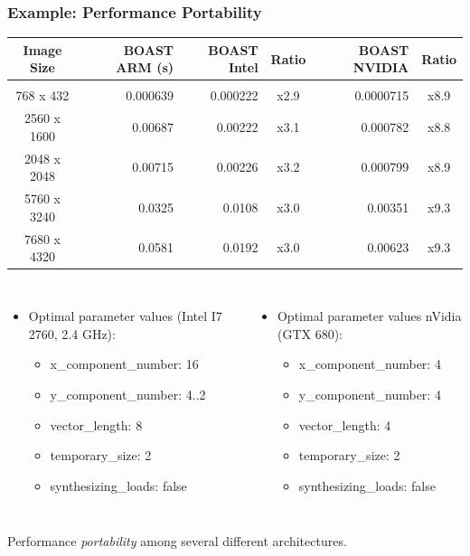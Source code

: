\documentclass{beamer}
\begin{document}
\begin{frame}
  \frametitle{Example: Performance Portability}
  \begin{center}
  \scriptsize
  \begin{tabular}{c|r|r|c|r|c}
    Image Size & BOAST ARM (s) & BOAST Intel & Ratio & BOAST NVIDIA & Ratio \\
    \hline&&&&\\
  768 x 432   & 0.000639     & 0.000222    & x2.9  & 0.0000715    & x8.9  \\
  2560 x 1600 & 0.00687      & 0.00222     & x3.1  & 0.000782     & x8.8  \\
  2048 x 2048 & 0.00715      & 0.00226     & x3.2  & 0.000799     & x8.9  \\
  5760 x 3240 & 0.0325       & 0.0108      & x3.0  & 0.00351      & x9.3  \\
  7680 x 4320 & 0.0581       & 0.0192      & x3.0  & 0.00623      & x9.3
  \end{tabular}
  \end{center}

  \begin{columns}
  \begin{itemize}
    \item \footnotesize Optimal parameter values (Intel I7 2760, 2.4 GHz):
    \begin{itemize}
      \item \scriptsize x\_component\_number: 16
      \item \scriptsize y\_component\_number: 4..2
      \item \scriptsize vector\_length: 8
      \item \scriptsize temporary\_size: 2
      \item \scriptsize synthesizing\_loads: false
    \end{itemize}
  \end{itemize}
  \begin{itemize}
    \item \footnotesize Optimal parameter values nVidia (GTX 680):
    \begin{itemize}
      \item \scriptsize x\_component\_number: 4
      \item \scriptsize y\_component\_number: 4
      \item \scriptsize vector\_length: 4
      \item \scriptsize temporary\_size: 2
      \item \scriptsize synthesizing\_loads: false
    \end{itemize}
  \end{itemize}
  \end{columns}
  \vspace{1cm}
  \centering Performance \emph{portability} among several different architectures.
\end{frame}
\end{document}
